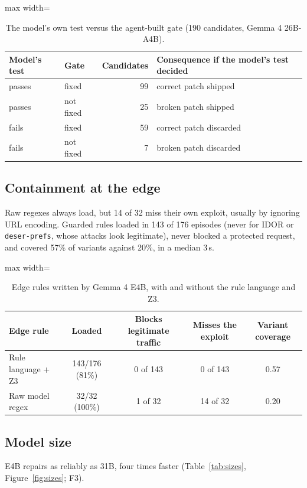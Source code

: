 \documentclass[10pt,a4paper]{article}
\newcommand{\code}[1]{\texttt{#1}}
\begin{document}
\begin{table}[H]
\centering\small
\caption{The model's own test versus the agent-built gate (190 candidates, Gemma 4 26B-A4B).}
\label{tab:selftest}
\begin{adjustbox}{max width=\linewidth}\begin{tabular}{llrl}
\toprule
Model's test & Gate & Candidates & Consequence if the model's test decided\\
\midrule
passes & fixed & 99 & correct patch shipped\\
passes & not fixed & 25 & broken patch shipped\\
fails & fixed & 59 & correct patch discarded\\
fails & not fixed & 7 & broken patch discarded\\
\bottomrule
\end{tabular}\end{adjustbox}
\end{table}

\subsection{Containment at the edge}
Raw regexes always load, but 14 of 32 miss their own exploit, usually by ignoring URL encoding. Guarded rules loaded in 143 of 176 episodes (never for IDOR or \code{deser-prefs}, whose attacks look legitimate), never blocked a protected request, and covered 57\% of variants against 20\%, in a median 3\,s.

\begin{table}[H]
\centering\small
\caption{Edge rules written by Gemma 4 E4B, with and without the rule language and Z3.}
\label{tab:edge}
\begin{adjustbox}{max width=\linewidth}\begin{tabular}{lcccc}
\toprule
Edge rule & Loaded & Blocks legitimate traffic & Misses the exploit & Variant coverage\\
\midrule
Rule language + Z3 & 143/176 (81\%) & 0 of 143 & 0 of 143 & 0.57\\
Raw model regex & 32/32 (100\%) & 1 of 32 & 14 of 32 & 0.20\\
\bottomrule
\end{tabular}\end{adjustbox}
\end{table}

\subsection{Model size}
E4B repairs as reliably as 31B, four times faster (Table~\ref{tab:sizes}, Figure~\ref{fig:sizes}; F3).
\end{document}
